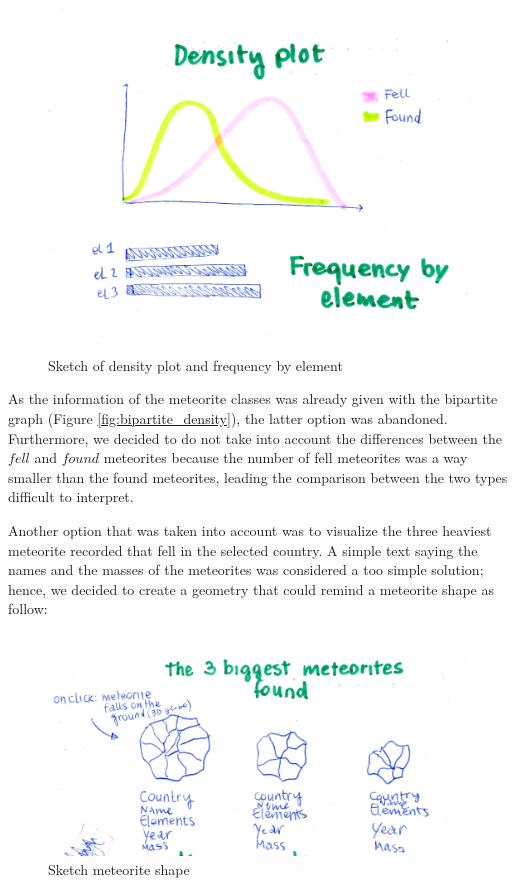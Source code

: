 \documentclass[10pt,conference,compsocconf]{IEEEtran}
\begin{document}
\begin{figure}[H]
  \centering
  \includegraphics[width=\columnwidth]{images/densityplot}
  \vspace{-3mm}
  \caption{Sketch of density plot and frequency by element}
  \label{fig:density_plot}
\end{figure}


As the information of the meteorite classes was already given with the bipartite graph (Figure \ref{fig:bipartite_density}), the latter option was abandoned. Furthermore, we decided to do not take into account the differences between the $fell$ and $found$ meteorites because the number of fell meteorites was a way smaller than the found meteorites, leading the comparison between the two types difficult to interpret.   

Another option that was taken into account was to visualize the three heaviest meteorite recorded that fell in the selected country. A simple text saying the names and the masses of the meteorites was considered a too simple solution; hence, we decided to create a geometry that could remind a meteorite shape as follow:

\begin{figure}[H]
  \centering
  \includegraphics[width=\columnwidth]{images/3biggestmeteorites}
  \vspace{-3mm}
  \caption{Sketch meteorite shape}
  \label{fig:sketch_3_biggest}
\end{figure}
\end{document}
